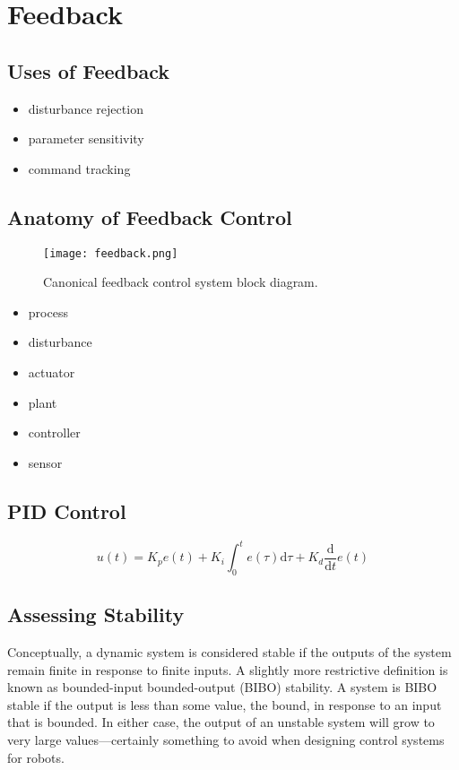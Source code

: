 \chapter{Feedback}\label{c:feedback}
\section{Uses of Feedback}
\begin{itemize}
\item disturbance rejection
\item parameter sensitivity
\item command tracking
\end{itemize}
\section{Anatomy of Feedback Control}

\begin{figure}[hbt]
\centering
\texttt{[image: feedback.png]}
\caption{Canonical feedback control system block diagram.}
\label{f:fdbk}
\end{figure}

\begin{itemize}
\item process
\item disturbance
\item actuator
\item plant 
\item controller
\item sensor
\end{itemize}


\section{PID Control}

\begin{equation}\label{e:pid}
u(t) = K_p e(t) + K_i \int_0^te(\tau) \mathrm{d}\tau + K_d \frac{\mathrm{d}}{\mathrm{d}t}e(t)
\end{equation}

\section{Assessing Stability}
Conceptually, a dynamic system is considered stable if the outputs of the system remain finite in response to finite inputs.  A slightly more restrictive definition is known as bounded-input bounded-output (BIBO) stability.  A system is BIBO stable if the output is less than some value, the bound, in response to an input that is bounded.  In either case, the output of an unstable system will grow to very large values---certainly something to avoid when designing control systems for robots.

